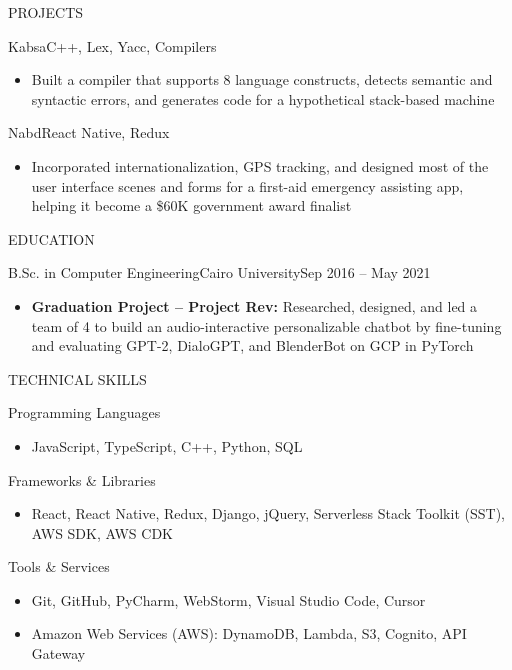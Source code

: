 \documentclass[]{mcdowellcv}
\begin{document}
	\begin{cvsection}{PROJECTS}
		\begin{cvsubsection}{Kabsa}{}{C++, Lex, Yacc, Compilers}
			\begin{itemize}
				\item Built a compiler that supports 8 language constructs, detects semantic and syntactic errors, and generates code for a hypothetical stack-based machine
			\end{itemize}
		\end{cvsubsection}
		\begin{cvsubsection}{Nabd}{}{React Native, Redux}
			\begin{itemize}
				\item Incorporated internationalization, GPS tracking, and designed most of the user interface scenes and forms for a first-aid emergency assisting app, helping it become a \$60K government award finalist
			\end{itemize}
		\end{cvsubsection}
	\end{cvsection}

	\begin{cvsection}{EDUCATION}
		\begin{cvsubsection}{B.Sc. in Computer Engineering}{Cairo University}{Sep 2016 -- May 2021}
			\begin{itemize}
				\item \textbf{Graduation Project -- Project Rev:} Researched, designed, and led a team of 4 to build an audio-interactive personalizable chatbot by fine-tuning and evaluating GPT-2, DialoGPT, and BlenderBot on GCP in PyTorch
			\end{itemize}
		\end{cvsubsection}
	\end{cvsection}
	
	\begin{cvsection}{TECHNICAL SKILLS}
		\begin{cvsubsection}{Programming Languages}{}{}
			\begin{itemize}
				\item JavaScript, TypeScript, C++, Python, SQL
			\end{itemize}
		\end{cvsubsection}
		\begin{cvsubsection}{Frameworks \& Libraries}{}{}
			\begin{itemize}
				\item React, React Native, Redux, Django, jQuery, Serverless Stack Toolkit (SST), AWS SDK, AWS CDK
			\end{itemize}
		\end{cvsubsection}
		\begin{cvsubsection}{Tools \& Services}{}{}
			\begin{itemize}
				\item Git, GitHub, PyCharm, WebStorm, Visual Studio Code, Cursor
				\item Amazon Web Services (AWS): DynamoDB, Lambda, S3, Cognito, API Gateway
			\end{itemize}
		\end{cvsubsection}
	\end{cvsection}
	
\end{document}
